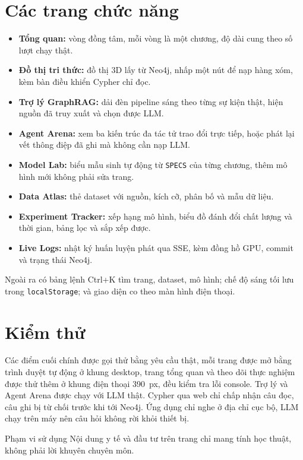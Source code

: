 \section{Các trang chức năng}
\begin{itemize}
  \item \textbf{Tổng quan:} vòng đồng tâm, mỗi vòng là một chương, độ dài cung theo số lượt chạy thật.
  \item \textbf{Đồ thị tri thức:} đồ thị 3D lấy từ Neo4j, nhấp một nút để nạp hàng xóm, kèm bàn điều khiển Cypher chỉ đọc.
  \item \textbf{Trợ lý GraphRAG:} dải đèn pipeline sáng theo từng sự kiện thật, hiện nguồn đã truy xuất và chọn được LLM.
  \item \textbf{Agent Arena:} xem ba kiến trúc đa tác tử trao đổi trực tiếp, hoặc phát lại vết thông điệp đã ghi mà không cần nạp LLM.
  \item \textbf{Model Lab:} biểu mẫu sinh tự động từ \texttt{SPECS} của từng chương, thêm mô hình mới không phải sửa trang.
  \item \textbf{Data Atlas:} thẻ dataset với nguồn, kích cỡ, phân bố và mẫu dữ liệu.
  \item \textbf{Experiment Tracker:} xếp hạng mô hình, biểu đồ đánh đổi chất lượng và thời gian, bảng lọc và sắp xếp được.
  \item \textbf{Live Logs:} nhật ký huấn luyện phát qua SSE, kèm đồng hồ GPU, commit và trạng thái Neo4j.
\end{itemize}
Ngoài ra có bảng lệnh Ctrl+K tìm trang, dataset, mô hình; chế độ sáng tối lưu trong \texttt{localStorage}; và giao diện co theo màn hình điện thoại.



\section{Kiểm thử}
Các điểm cuối chính được gọi thử bằng yêu cầu thật, mỗi trang được mở bằng trình duyệt tự động ở khung desktop, trang tổng quan và theo dõi thực nghiệm được thử thêm ở khung điện thoại 390~px, đều kiểm tra lỗi console. Trợ lý và Agent Arena được chạy với LLM thật. Cypher qua web chỉ chấp nhận câu đọc, câu ghi bị từ chối trước khi tới Neo4j. Ứng dụng chỉ nghe ở địa chỉ cục bộ, LLM chạy trên máy nên câu hỏi không rời khỏi thiết bị.

\begin{luuy}{Phạm vi sử dụng}
Nội dung y tế và đầu tư trên trang chỉ mang tính học thuật, không phải lời khuyên chuyên môn.
\end{luuy}
